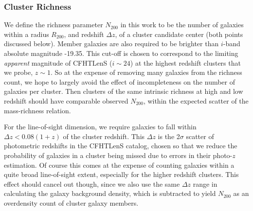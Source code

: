 \subsubsection{Cluster Richness}
\label{rich}
We define the richness parameter $N_{200}$ in this work to be the number of galaxies within a radius $R_{200}$, and redshift $\Delta z$, of a cluster candidate center (both points discussed below). Member galaxies are also required to be brighter than $i$-band absolute magnitude -19.35. This cut-off is chosen to correspond to the limiting {\it apparent} magnitude of \ac{CFHTLenS} ($i \sim 24$) at the highest redshift clusters that we probe, $z \sim 1$. So at the expense of removing many galaxies from the richness count, we hope to largely avoid the effect of incompleteness on the number of galaxies per cluster. Then clusters of the same intrinsic richness at high and low redshift should have comparable observed $N_{200}$, within the expected scatter of the mass-richness relation.

For the line-of-sight dimension, we require galaxies to fall within $\Delta z < 0.08(1+z)$ of the cluster redshift. This $\Delta z$ is the 2$\sigma$ scatter of photometric redshifts in the \ac{CFHTLenS} catalog, chosen so that we reduce the probability of galaxies in a cluster being missed due to errors in their photo-$z$ estimation. Of course this comes at the expense of counting galaxies within a quite broad line-of-sight extent, especially for the higher redshift clusters. This effect should cancel out though, since we also use the same $\Delta z$ range in calculating the galaxy background density, which is subtracted to yield $N_{200}$ as an overdensity count of cluster galaxy members.

